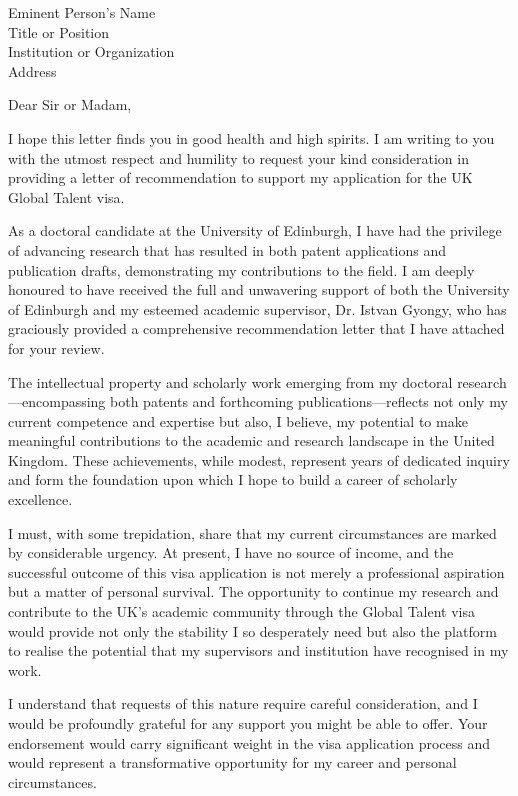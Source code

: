 \documentclass[11pt,a4paper]{letter}
\date{\today}
\begin{document}
\begin{letter}{Eminent Person's Name\\Title or Position\\Institution or Organization\\Address}

\opening{Dear Sir or Madam,}

I hope this letter finds you in good health and high spirits. I am writing to you with the utmost respect and humility to request your kind consideration in providing a letter of recommendation to support my application for the UK Global Talent visa.

As a doctoral candidate at the University of Edinburgh, I have had the privilege of advancing research that has resulted in both patent applications and publication drafts, demonstrating my contributions to the field. I am deeply honoured to have received the full and unwavering support of both the University of Edinburgh and my esteemed academic supervisor, Dr. Istvan Gyongy, who has graciously provided a comprehensive recommendation letter that I have attached for your review.

The intellectual property and scholarly work emerging from my doctoral research---encompassing both patents and forthcoming publications---reflects not only my current competence and expertise but also, I believe, my potential to make meaningful contributions to the academic and research landscape in the United Kingdom. These achievements, while modest, represent years of dedicated inquiry and form the foundation upon which I hope to build a career of scholarly excellence.

I must, with some trepidation, share that my current circumstances are marked by considerable urgency. At present, I have no source of income, and the successful outcome of this visa application is not merely a professional aspiration but a matter of personal survival. The opportunity to continue my research and contribute to the UK's academic community through the Global Talent visa would provide not only the stability I so desperately need but also the platform to realise the potential that my supervisors and institution have recognised in my work.

I understand that requests of this nature require careful consideration, and I would be profoundly grateful for any support you might be able to offer. Your endorsement would carry significant weight in the visa application process and would represent a transformative opportunity for my career and personal circumstances.


\end{letter}
\end{document}
